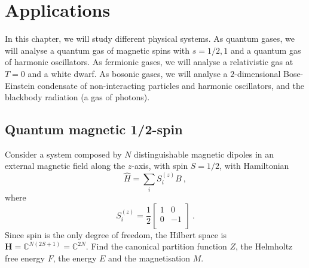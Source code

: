 \chapter{Applications}

    In this chapter, we will study different physical systems. As quantum gases, we will analyse a quantum gas of magnetic spins with $s= 1/2, 1$ and a quantum gas of harmonic oscillators. As fermionic gases, we will analyse a relativistic gas at $T=0$ and a white dwarf. As bosonic gases, we will analyse a $2$-dimensional Bose-Einstein condensate of non-interacting particles and harmonic oscillators, and the blackbody radiation (a gas of photons).

\section{Quantum magnetic 1/2-spin}

    \begin{exercise}
        Consider a system composed by $N$ distinguishable magnetic dipoles in an external magnetic field along the $z$-axis, with spin $S = 1/2$, with Hamiltonian 
        \begin{equation*}
            \hat H = \sum_i S^{(z)}_i B ~,
        \end{equation*}
        where
        \begin{equation*}
            S^{(z)}_i = \frac{1}{2} \begin{bmatrix}
                1 & 0 \\
                0 & -1 \\
            \end{bmatrix} ~.
        \end{equation*}
        Since spin is the only degree of freedom, the Hilbert space is $\mathbf H = \mathbb C^{N (2S + 1)} = \mathbb C^{2N}$.
        Find the canonical partition function $Z$, the Helmholtz free energy $F$, the energy $E$ and the magnetisation $M$.
    \end{exercise}

